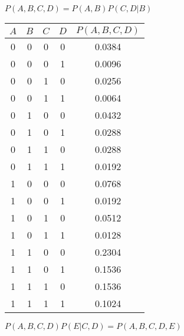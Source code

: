 \documentclass{homework}
\begin{document}
$P(A, B, C, D) = P(A, B) P(C, D | B)$

\begin{table}[h!]
    \centering
    \begin{tabular}{cccc|c}
        $A$ & $B$ & $C$ & $D$ & $P(A, B, C, D)$ \\
        \midrule
        0 & 0 & 0 & 0 & 0.0384 \\
        0 & 0 & 0 & 1 & 0.0096 \\
        0 & 0 & 1 & 0 & 0.0256 \\
        0 & 0 & 1 & 1 & 0.0064 \\
        0 & 1 & 0 & 0 & 0.0432 \\
        0 & 1 & 0 & 1 & 0.0288 \\
        0 & 1 & 1 & 0 & 0.0288 \\
        0 & 1 & 1 & 1 & 0.0192 \\
        1 & 0 & 0 & 0 & 0.0768 \\
        1 & 0 & 0 & 1 & 0.0192 \\
        1 & 0 & 1 & 0 & 0.0512 \\
        1 & 0 & 1 & 1 & 0.0128 \\
        1 & 1 & 0 & 0 & 0.2304 \\
        1 & 1 & 0 & 1 & 0.1536 \\
        1 & 1 & 1 & 0 & 0.1536 \\
        1 & 1 & 1 & 1 & 0.1024 \\
    \end{tabular}
\end{table}

$P(A, B, C, D) P(E | C, D) = P(A, B, C, D, E)$
\end{document}
